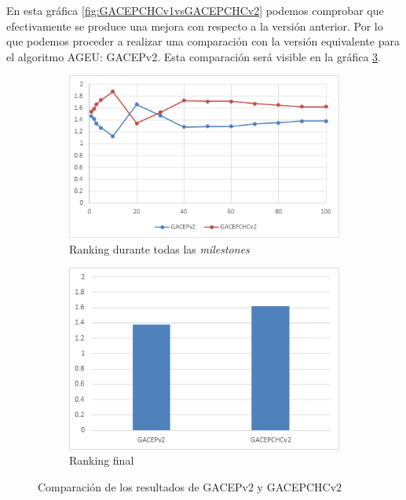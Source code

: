 En esta gráfica \ref{fig:GACEPCHCv1vsGACEPCHCv2} podemos comprobar que efectivamente se produce una mejora con respecto a la versión anterior. 
Por lo que podemos proceder a realizar una comparación con la versión equivalente para el algoritmo AGEU: GACEPv2. 
Esta comparación será visible en la gráfica \ref{fig:GACEPv2vsGACEPCHCv2}.

\begin{figure}[h]
     \centering
     \begin{subfigure}[b]{0.45\textwidth}
         \centering
         \includegraphics[width=\textwidth]{imagenes/Experimental/GACEPv2vsGACEPCHCv2.png}
         \caption{Ranking durante todas las \textit{milestones}}
         \label{fig:GACEPv2vsGACEPCHCv2_lineas}
     \end{subfigure}
     \hfill
     \begin{subfigure}[b]{0.45\textwidth}
         \centering
         \includegraphics[width=\textwidth]{imagenes/Experimental/barras/GACEPv2vsGACEPCHCv2.png}
         \caption{Ranking final}
         \label{fig:GACEPv2vsGACEPCHCv2_barras}
     \end{subfigure}
        \caption{Comparación de los resultados de GACEPv2 y GACEPCHCv2}
        \label{fig:GACEPv2vsGACEPCHCv2}
\end{figure}

